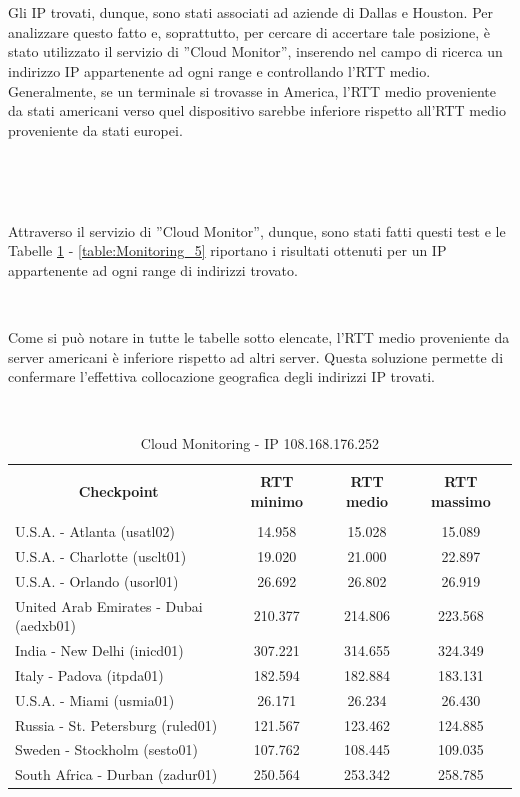 \documentclass[a4paper,11pt]{book}
\begin{document}
~

~


Gli IP trovati, dunque, sono stati associati ad aziende di Dallas e Houston. 
Per analizzare questo fatto e, soprattutto, per cercare di accertare tale posizione, \`e stato utilizzato il servizio di ''Cloud Monitor'', inserendo nel campo di ricerca un indirizzo IP appartenente ad ogni range e controllando l'RTT medio. 
Generalmente, se un terminale si trovasse in America, l'RTT medio proveniente da stati americani verso quel dispositivo sarebbe inferiore rispetto all'RTT medio proveniente da stati europei.

~

~

Attraverso il servizio di ''Cloud Monitor'', dunque, sono stati fatti questi test e le Tabelle \ref{table:Monitoring_1} - \ref{table:Monitoring_5} riportano i risultati ottenuti per un IP appartenente ad ogni range di indirizzi trovato.

~

Come si pu\`o notare in tutte le tabelle sotto elencate, l'RTT medio proveniente da server americani è inferiore rispetto ad altri server. Questa soluzione permette di confermare l'effettiva collocazione geografica degli indirizzi IP trovati.

~

\begin{table}[!ht]
\begin{tabular}{|l|c|c|c|}
\hline
\multicolumn{1}{|c|}{\textbf{}} & {\textbf{}} & {\textbf{}} & {\textbf{}}\\
\multicolumn{1}{|c|}{\textbf{Checkpoint}} & {\textbf{RTT minimo}} & {\textbf{RTT medio}} & {\textbf{RTT massimo}}\\
\multicolumn{1}{|c|}{\textbf{}} & {\textbf{}} & {\textbf{}} & {\textbf{}}\\
\hline
U.S.A. - Atlanta (usatl02) & 14.958 & 15.028 & 15.089\\
U.S.A. - Charlotte (usclt01) & 19.020 & 21.000 & 22.897\\
U.S.A. - Orlando (usorl01) & 26.692 & 26.802 & 26.919\\
United Arab Emirates - Dubai (aedxb01) & 210.377 & 214.806 & 223.568\\
India - New Delhi (inicd01) & 307.221 & 314.655 & 324.349\\
Italy - Padova (itpda01) & 182.594 & 182.884 & 183.131\\
U.S.A. - Miami (usmia01) & 26.171 & 26.234 & 26.430\\
Russia - St. Petersburg (ruled01) & 121.567 & 123.462 & 124.885\\
Sweden - Stockholm (sesto01) & 107.762 & 108.445 & 109.035\\
South Africa - Durban (zadur01) & 250.564 & 253.342 & 258.785\\
\hline
\end{tabular}
\caption{Cloud Monitoring - IP 108.168.176.252}\label{table:Monitoring_1}
\end{table}
\end{document}
